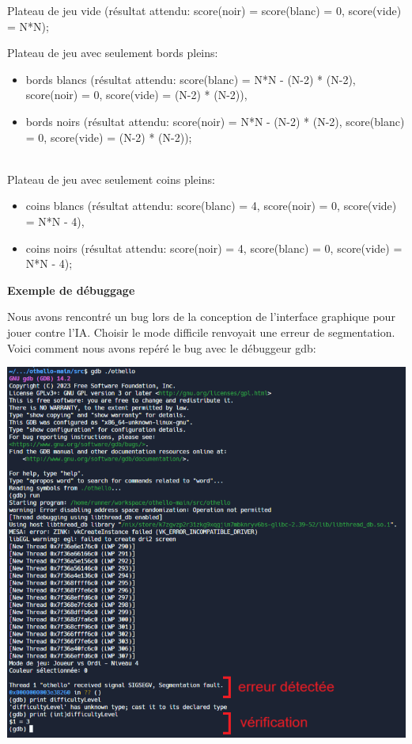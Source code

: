 \documentclass[12pt, a4paper, oneside]{article}
\begin{document}
    Plateau de jeu vide (résultat attendu: score(noir) = score(blanc) = 0, score(vide) = N*N);

    Plateau de jeu avec seulement bords pleins:
    \begin{itemize}
        \item bords blancs (résultat attendu: score(blanc) = N*N - (N-2) * (N-2), score(noir) = 0, score(vide) = (N-2) * (N-2)),
        \item bords noirs (résultat attendu: score(noir) = N*N - (N-2) * (N-2), score(blanc) = 0, score(vide) = (N-2) * (N-2));
    \end{itemize} \\
    
    Plateau de jeu avec seulement coins pleins:
    \begin{itemize}
        \item coins blancs (résultat attendu: score(blanc) = 4, score(noir) = 0, score(vide) = N*N - 4),
        \item coins noirs (résultat attendu: score(noir) = 4, score(blanc) = 0, score(vide) = N*N - 4);
    \end{itemize}

\newpage


    \textbf{Exemple de débuggage}
    
    Nous avons rencontré un bug lors de la conception de l'interface graphique pour jouer contre l'IA. Choisir le mode difficile
    renvoyait une erreur de segmentation. Voici comment nous avons repéré le bug avec le débuggeur gdb:

    \begin{center}
        \includegraphics[scale=0.7]{gdb.png}
    \end{center}
\end{document}
